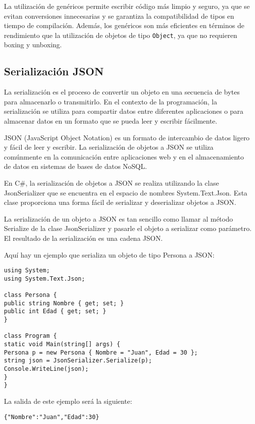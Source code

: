\documentclass[executivepaper]{article}
\begin{document}
La utilización de genéricos permite escribir código más limpio y seguro, ya que se evitan conversiones innecesarias y se garantiza la compatibilidad de tipos en tiempo de compilación. Además, los genéricos son más eficientes en términos de rendimiento que la utilización de objetos de tipo \texttt{Object}, ya que no requieren boxing y unboxing.

\subsection{Serialización JSON}


La serialización es el proceso de convertir un objeto en una secuencia de bytes para almacenarlo o transmitirlo. En el contexto de la programación, la serialización se utiliza para compartir datos entre diferentes aplicaciones o para almacenar datos en un formato que se pueda leer y escribir fácilmente.

JSON (JavaScript Object Notation) es un formato de intercambio de datos ligero y fácil de leer y escribir. La serialización de objetos a JSON se utiliza comúnmente en la comunicación entre aplicaciones web y en el almacenamiento de datos en sistemas de bases de datos NoSQL.

En C\#, la serialización de objetos a JSON se realiza utilizando la clase JsonSerializer que se encuentra en el espacio de nombres System.Text.Json. Esta clase proporciona una forma fácil de serializar y deserializar objetos a JSON.

La serialización de un objeto a JSON es tan sencillo como llamar al método Serialize de la clase JsonSerializer y pasarle el objeto a serializar como parámetro. El resultado de la serialización es una cadena JSON.

Aquí hay un ejemplo que serializa un objeto de tipo Persona a JSON:

\begin{lstlisting}
using System;
using System.Text.Json;

class Persona {
public string Nombre { get; set; }
public int Edad { get; set; }
}

class Program {
static void Main(string[] args) {
Persona p = new Persona { Nombre = "Juan", Edad = 30 };
string json = JsonSerializer.Serialize(p);
Console.WriteLine(json);
}
}
\end{lstlisting}

La salida de este ejemplo será la siguiente:

\begin{lstlisting}
{"Nombre":"Juan","Edad":30}
\end{lstlisting}
\end{document}
